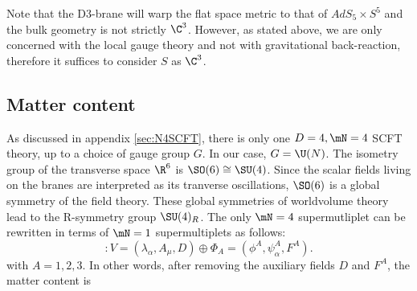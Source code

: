 \documentclass{worksheetclass}
\begin{document}
        Note that the D$3$-brane will warp the flat space metric to that of $AdS_5\times S^5$ and the bulk geometry is not strictly $\C^3$. However, as stated above, we are only concerned with the local gauge theory and not with gravitational back-reaction, therefore it suffices to consider $S$ as $\C^3$.

    \subsection{Matter content}

        As discussed in appendix \ref{sec:N4SCFT}, there is only one $D=4,\mN=4$ SCFT theory, up to a choice of gauge group $G$. In our case, $G=\U(N)$. The isometry group of the transverse space $\R^6$ is $\SO(6)\cong\SU(4)$. Since the scalar fields living on the branes are interpreted as its tranverse oscillations, $\SO(6)$ is a global symmetry of the field theory. These global symmetries of worldvolume theory lead to the R-symmetry group $\SU(4)_R$. The only $\mN=4$ supermutliplet can be rewritten in terms of $\mN=1$ supermultiplets as follows:
        \begin{equation}
            [\mN = 4 \text{ vector multiplet}] : V = (\lambda_\alpha, A_\mu, D) \oplus \Phi_A = (\phi^A,\psi^A_\alpha,F^A).
        \end{equation}
        with $A=1,2,3$. In other words, after removing the auxiliary fields $D$ and $F^A$, the matter content is
\end{document}
